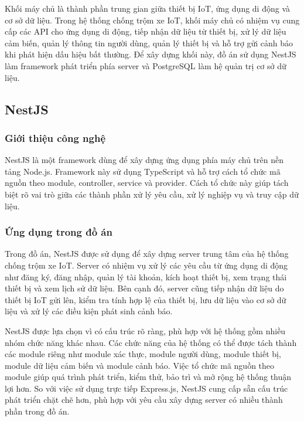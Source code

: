\documentclass[../DoAn.tex]{subfiles}
\begin{document}
Khối máy chủ là thành phần trung gian giữa thiết bị IoT, ứng dụng di động và cơ sở dữ liệu. Trong hệ thống chống trộm xe IoT, khối máy chủ có nhiệm vụ cung cấp các API cho ứng dụng di động, tiếp nhận dữ liệu từ thiết bị, xử lý dữ liệu cảm biến, quản lý thông tin người dùng, quản lý thiết bị và hỗ trợ gửi cảnh báo khi phát hiện dấu hiệu bất thường. Để xây dựng khối này, đồ án sử dụng NestJS làm framework phát triển phía server và PostgreSQL làm hệ quản trị cơ sở dữ liệu.

\subsection{NestJS}
\label{subsection:3.nestjs}

\subsubsection{Giới thiệu công nghệ}

NestJS là một framework dùng để xây dựng ứng dụng phía máy chủ trên nền tảng Node.js. Framework này sử dụng TypeScript và hỗ trợ cách tổ chức mã nguồn theo module, controller, service và provider. Cách tổ chức này giúp tách biệt rõ vai trò giữa các thành phần xử lý yêu cầu, xử lý nghiệp vụ và truy cập dữ liệu.

\subsubsection{Ứng dụng trong đồ án}

Trong đồ án, NestJS được sử dụng để xây dựng server trung tâm của hệ thống chống trộm xe IoT. Server có nhiệm vụ xử lý các yêu cầu từ ứng dụng di động như đăng ký, đăng nhập, quản lý tài khoản, kích hoạt thiết bị, xem trạng thái thiết bị và xem lịch sử dữ liệu. Bên cạnh đó, server cũng tiếp nhận dữ liệu do thiết bị IoT gửi lên, kiểm tra tính hợp lệ của thiết bị, lưu dữ liệu vào cơ sở dữ liệu và xử lý các điều kiện phát sinh cảnh báo.

NestJS được lựa chọn vì có cấu trúc rõ ràng, phù hợp với hệ thống gồm nhiều nhóm chức năng khác nhau. Các chức năng của hệ thống có thể được tách thành các module riêng như module xác thực, module người dùng, module thiết bị, module dữ liệu cảm biến và module cảnh báo. Việc tổ chức mã nguồn theo module giúp quá trình phát triển, kiểm thử, bảo trì và mở rộng hệ thống thuận lợi hơn. So với việc sử dụng trực tiếp Express.js, NestJS cung cấp sẵn cấu trúc phát triển chặt chẽ hơn, phù hợp với yêu cầu xây dựng server có nhiều thành phần trong đồ án.
\end{document}
